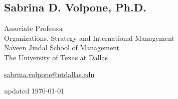 \documentclass[12pt,letterpaper]{report} %
\begin{document}
    \subsection*{Sabrina D. Volpone, Ph.D.}
        \begin{minipage}[t]{0.700\textwidth}
        Associate Professor\\
        Organizations, Strategy and International Management\\
        Naveen Jindal School of Management\\
        The University of Texas at Dallas
        \end{minipage}
        \begin{minipage}[t]{0.295\textwidth}
        \flushright{}
        \href{mailto:sabrina.volpone@utdallas.edu}{sabrina.volpone@utdallas.edu} \\
        \end{minipage}
        
    \begin{center}
       \vfill
        updated \monthyeardate\today
    \end{center}
\end{document}
